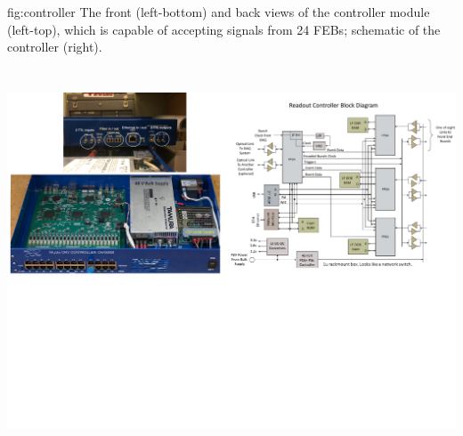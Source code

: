 \begin{dunefigure}
 {fig:controller}
 {The front (left-bottom) and back views of the controller module (left-top), which is capable of accepting signals from 24 FEBs; schematic of the controller (right).}
\includegraphics[height=4.8in]{graphics/pds-controller.pdf} 
\vspace{-5.5cm}
\end{dunefigure}


